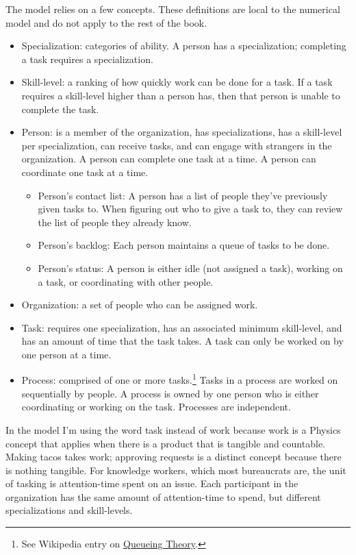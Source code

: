 The model relies on a few concepts. These definitions are local to the numerical model and do not apply to the rest of the book.
\begin{itemize}
    \item Specialization: categories of ability. A person has a specialization; completing a task requires a specialization.
    \item Skill-level: a ranking of how quickly work can be done for a task. If a task requires a skill-level higher than a person has, then that person is unable to complete the task.
    \item Person: is a member of the organization, has specializations, has a skill-level per specialization, can receive tasks, and can engage with strangers in the organization. A person can complete one task at a time. A person can coordinate one task at a time. 
    \begin{itemize}
        \item Person's contact list: A person has a list of people they've previously given tasks to. When figuring out who to give a task to, they can review the list of people they already know. 
        \item Person's backlog: Each person maintains a queue of tasks to be done.
        \item Person's status: A person is either idle (not assigned a task), working on a task, or coordinating with other people. 
    \end{itemize}
    \item Organization: a set of people who can be assigned work. 
    \item Task: requires one specialization, has an associated minimum skill-level, and has an amount of time that the task takes. A task can only be worked on by one person at a time. 
    \item Process: comprised of one or more tasks.\footnote{See Wikipedia entry on 
    \href{https://en.wikipedia.org/wiki/Queueing_theory}{Queueing Theory}.} Tasks in a process are worked on sequentially by people. A process is owned by one person who is either coordinating or working on the task.  Processes are independent.
\end{itemize}

In the model I'm using the word task instead of work because work is a Physics concept that applies when there is a product that is tangible and countable. Making tacos takes work; approving requests is a distinct concept because there is nothing tangible. For knowledge workers, which most bureaucrats are, the unit of tasking is attention-time spent on an issue.
Each participant in the organization has the same amount of attention-time to spend, but different specializations and skill-levels.

